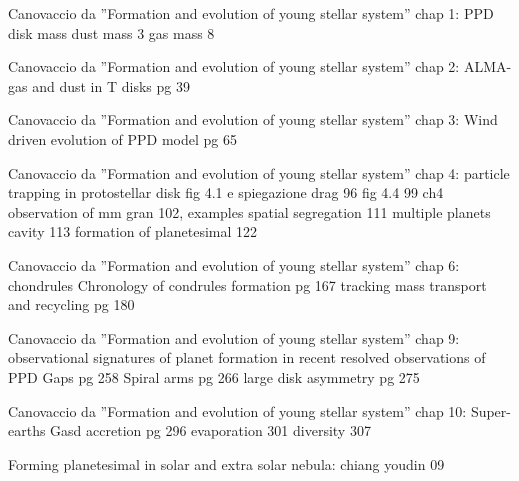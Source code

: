 \begin{wordonframe}{Canovaccio da ''Formation and evolution of young stellar system'' chap 1: PPD disk mass}
dust mass 3
gas mass 8
\end{wordonframe}

\begin{wordonframe}{Canovaccio da ''Formation and evolution of young stellar system'' chap 2: ALMA-gas and dust in T disks}
pg 39
\end{wordonframe}

\begin{wordonframe}{Canovaccio da ''Formation and evolution of young stellar system'' chap 3: Wind driven evolution of PPD}
model pg 65
\end{wordonframe}

\begin{wordonframe}{Canovaccio da ''Formation and evolution of young stellar system'' chap 4: particle trapping in protostellar disk}
fig 4.1 e spiegazione
drag 96
fig 4.4 99
ch4 observation of mm gran 102,  examples spatial segregation 111
multiple planets cavity 113
formation of planetesimal 122

\end{wordonframe}

\begin{wordonframe}{Canovaccio da ''Formation and evolution of young stellar system'' chap 6: chondrules}
Chronology of condrules formation pg 167
tracking mass transport and recycling pg 180
\end{wordonframe}

\begin{wordonframe}{Canovaccio da ''Formation and evolution of young stellar system'' chap 9: observational signatures of planet formation in recent resolved observations of PPD}
Gaps pg 258
Spiral arms pg 266
large disk asymmetry pg 275
\end{wordonframe}

\begin{wordonframe}{Canovaccio da ''Formation and evolution of young stellar system'' chap 10: Super-earths}
Gasd accretion pg 296
evaporation 301
diversity 307
\end{wordonframe}

\begin{wordonframe}{Forming planetesimal in solar and extra solar nebula: chiang youdin 09}

\end{wordonframe}

